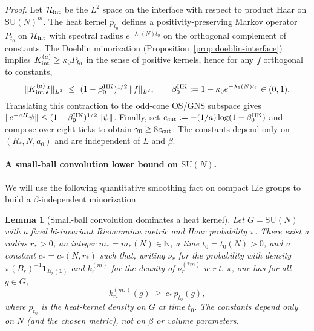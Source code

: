 \documentclass[11pt]{amsart}
\theoremstyle{plain}
\newtheorem{lemma}[theorem]{Lemma}
\theoremstyle{definition}
\theoremstyle{remark}
\begin{document}
\emph{Proof.} Let $\mathcal H_{\rm int}$ be the $L^2$ space on the interface with respect to product Haar on $\mathrm{SU}(N)^m$. The heat kernel $p_{t_0}$ defines a positivity-preserving Markov operator $P_{t_0}$ on $\mathcal H_{\rm int}$ with spectral radius $e^{-\lambda_1(N) t_0}$ on the orthogonal complement of constants. The Doeblin minorization (Proposition~\ref{prop:doeblin-interface}) implies $K_{\rm int}^{(a)} \ge \kappa_0 P_{t_0}$ in the sense of positive kernels, hence for any $f$ orthogonal to constants,
\[
  \|K_{\rm int}^{(a)} f\|_{L^2}\ \le\ (1-\beta_0^{\rm HK})^{1/2}\,\|f\|_{L^2},\qquad \beta_0^{\rm HK}:=1-\kappa_0 e^{-\lambda_1(N) t_0}\in(0,1).
\]
Translating this contraction to the odd-cone OS/GNS subspace gives $\|e^{-aH}\psi\|\le (1-\beta_0^{\rm HK})^{1/2}\,\|\psi\|$. Finally, set $c_{\rm cut}:=-(1/a)\log(1-\beta_0^{\rm HK})$ and compose over eight ticks to obtain $\gamma_0\ge 8 c_{\rm cut}$. The constants depend only on $(R_*,N,a_0)$ and are independent of $L$ and $\beta$.

\paragraph{A small-ball convolution lower bound on $\mathrm{SU}(N)$.}
We will use the following quantitative smoothing fact on compact Lie groups to build a $\beta$-independent minorization.

\begin{lemma}[Small-ball convolution dominates a heat kernel]\label{lem:ball-conv-lower}
Let $G=\mathrm{SU}(N)$ with a fixed bi-invariant Riemannian metric and Haar probability $\pi$. There exist a radius $r_*>0$, an integer $m_*=m_*(N)\in\mathbb N$, a time $t_0=t_0(N)>0$, and a constant $c_*=c_*(N,r_*)$ such that, writing $\nu_r$ for the probability with density $\pi(B_r)^{-1}\mathbf 1_{B_r(\mathbf 1)}$ and $k_{r}^{(m)}$ for the density of $\nu_r^{(*m)}$ w.r.t. $\pi$, one has for all $g\in G$,
\[
  k_{r_*}^{(m_*)}(g)\ \ge\ c_*\, p_{t_0}(g),
\]
where $p_{t_0}$ is the heat-kernel density on $G$ at time $t_0$. The constants depend only on $N$ (and the chosen metric), not on $\beta$ or volume parameters.
\end{lemma}
\end{document}
